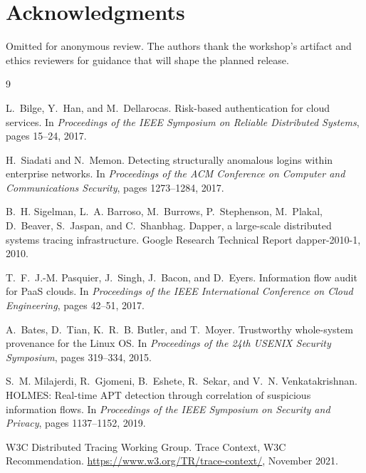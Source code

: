 \section*{Acknowledgments}

Omitted for anonymous review. The authors thank the workshop's artifact and
ethics reviewers for guidance that will shape the planned release.

\begin{thebibliography}{9}

L.~Bilge, Y.~Han, and M.~Dellarocas.
\newblock Risk-based authentication for cloud services.
\newblock In \emph{Proceedings of the IEEE Symposium on Reliable Distributed
Systems}, pages 15--24, 2017.

H.~Siadati and N.~Memon.
\newblock Detecting structurally anomalous logins within enterprise networks.
\newblock In \emph{Proceedings of the ACM Conference on Computer and
Communications Security}, pages 1273--1284, 2017.

B.~H. Sigelman, L.~A. Barroso, M.~Burrows, P.~Stephenson, M.~Plakal,
D.~Beaver, S.~Jaspan, and C.~Shanbhag.
\newblock Dapper, a large-scale distributed systems tracing infrastructure.
\newblock Google Research Technical Report dapper-2010-1, 2010.

T.~F.~J.-M. Pasquier, J.~Singh, J.~Bacon, and D.~Eyers.
\newblock Information flow audit for PaaS clouds.
\newblock In \emph{Proceedings of the IEEE International Conference on Cloud
Engineering}, pages 42--51, 2017.

A.~Bates, D.~Tian, K.~R.~B. Butler, and T.~Moyer.
\newblock Trustworthy whole-system provenance for the Linux OS.
\newblock In \emph{Proceedings of the 24th USENIX Security Symposium},
pages 319--334, 2015.

S.~M. Milajerdi, R.~Gjomeni, B.~Eshete, R.~Sekar, and V.~N. Venkatakrishnan.
\newblock HOLMES: Real-time APT detection through correlation of suspicious
information flows.
\newblock In \emph{Proceedings of the IEEE Symposium on Security and Privacy},
pages 1137--1152, 2019.

W3C Distributed Tracing Working Group.
\newblock Trace Context, W3C Recommendation.
\newblock \url{https://www.w3.org/TR/trace-context/}, November 2021.

\end{thebibliography}
